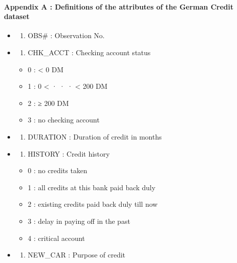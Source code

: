 \documentclass[
]{article}
\providecommand{\tightlist}{%
  \setlength{\itemsep}{0pt}\setlength{\parskip}{0pt}}
\begin{document}
\hypertarget{appendix-a-definitions-of-the-attributes-of-the-german-credit-dataset}{%
\paragraph{Appendix A : Definitions of the attributes of the German
Credit
dataset}\label{appendix-a-definitions-of-the-attributes-of-the-german-credit-dataset}}

\begin{itemize}
\item
  \begin{enumerate}
  \def\labelenumi{\arabic{enumi})}
  \tightlist
  \item
    OBS\# : Observation No.~
  \end{enumerate}
\item
  \begin{enumerate}
  \def\labelenumi{\arabic{enumi})}
  \setcounter{enumi}{1}
  \tightlist
  \item
    CHK\_ACCT : Checking account status
  \end{enumerate}

  \begin{itemize}
  \tightlist
  \item
    0 : \textless{} 0 DM
  \item
    1 : 0 \textless{} · · · \textless{} 200 DM
  \item
    2 : ≥ 200 DM
  \item
    3 : no checking account
  \end{itemize}
\item
  \begin{enumerate}
  \def\labelenumi{\arabic{enumi})}
  \setcounter{enumi}{2}
  \tightlist
  \item
    DURATION : Duration of credit in months
  \end{enumerate}
\item
  \begin{enumerate}
  \def\labelenumi{\arabic{enumi})}
  \setcounter{enumi}{3}
  \tightlist
  \item
    HISTORY : Credit history
  \end{enumerate}

  \begin{itemize}
  \tightlist
  \item
    0 : no credits taken
  \item
    1 : all credits at this bank paid back duly
  \item
    2 : existing credits paid back duly till now
  \item
    3 : delay in paying off in the past
  \item
    4 : critical account
  \end{itemize}
\item
  \begin{enumerate}
  \def\labelenumi{\arabic{enumi})}
  \setcounter{enumi}{4}
  \tightlist
  \item
    NEW\_CAR : Purpose of credit
  \end{enumerate}


\end{itemize}
\end{document}
